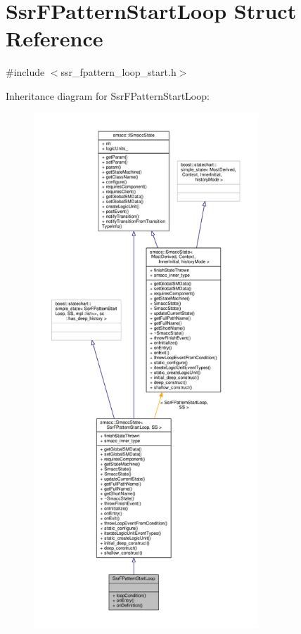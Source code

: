 \hypertarget{structSsrFPatternStartLoop}{}\section{Ssr\+F\+Pattern\+Start\+Loop Struct Reference}
\label{structSsrFPatternStartLoop}


{\ttfamily \#include $<$ssr\+\_\+fpattern\+\_\+loop\+\_\+start.\+h$>$}



Inheritance diagram for Ssr\+F\+Pattern\+Start\+Loop\+:
\nopagebreak
\begin{figure}[H]
\begin{center}
\leavevmode
\includegraphics[height=550pt]{structSsrFPatternStartLoop__inherit__graph}
\end{center}
\end{figure}


